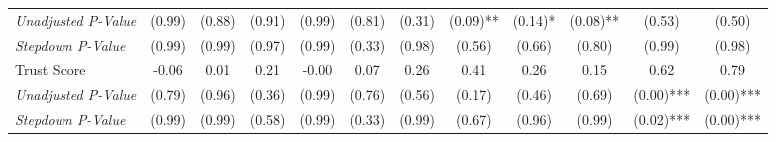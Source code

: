 \begin{tabular}{l c c c c c c c c c c c}
\quad \textit{Unadjusted P-Value} & (0.99) & (0.88) & (0.91) & (0.99) & (0.81) & (0.31) & (0.09)** & (0.14)* & (0.08)** & (0.53) & (0.50) \\
\quad \textit{Stepdown P-Value} & (0.99) & (0.99) & (0.97) & (0.99) & (0.33) & (0.98) & (0.56) & (0.66) & (0.80) & (0.99) & (0.98) \\
Trust Score & -0.06 & 0.01 & 0.21 & -0.00 & 0.07 & 0.26 & 0.41 & 0.26 & 0.15 & 0.62 & 0.79 \\
\quad \textit{Unadjusted P-Value} & (0.79) & (0.96) & (0.36) & (0.99) & (0.76) & (0.56) & (0.17) & (0.46) & (0.69) & (0.00)*** & (0.00)*** \\
\quad \textit{Stepdown P-Value} & (0.99) & (0.99) & (0.58) & (0.99) & (0.33) & (0.99) & (0.67) & (0.96) & (0.99) & (0.02)*** & (0.00)*** \\
\bottomrule
\end{tabular}
